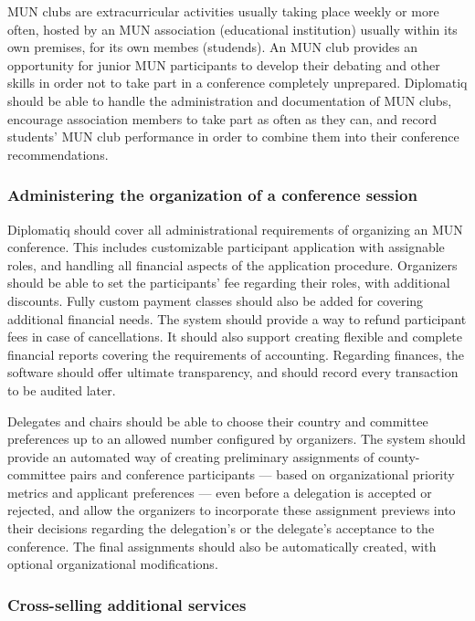 MUN clubs are extracurricular activities usually taking place weekly or more often, hosted by an MUN association (educational institution) usually within its own premises, for its own membes (studends). An MUN club provides an opportunity for junior MUN participants to develop their debating and other skills in order not to take part in a conference completely unprepared. Diplomatiq should be able to handle the administration and documentation of MUN clubs, encourage association members to take part as often as they can, and record students' MUN club performance in order to combine them into their conference recommendations.

\subsubsection{Administering the organization of a conference session}

Diplomatiq should cover all administrational requirements of organizing an MUN conference. This includes customizable participant application with assignable roles, and handling all financial aspects of the application procedure. Organizers should be able to set the participants' fee regarding their roles, with additional discounts. Fully custom payment classes should also be added for covering additional financial needs. The system should provide a way to refund participant fees in case of cancellations. It should also support creating flexible and complete financial reports covering the requirements of accounting. Regarding finances, the software should offer ultimate transparency, and should record every transaction to be audited later.

Delegates and chairs should be able to choose their country and committee preferences up to an allowed number configured by organizers. The system should provide an automated way of creating preliminary assignments of county-committee pairs and conference participants — based on organizational priority metrics and applicant preferences — even before a delegation is accepted or rejected, and allow the organizers to incorporate these assignment previews into their decisions regarding the delegation's or the delegate's acceptance to the conference. The final assignments should also be automatically created, with optional organizational modifications.

\subsubsection{Cross-selling additional services}

